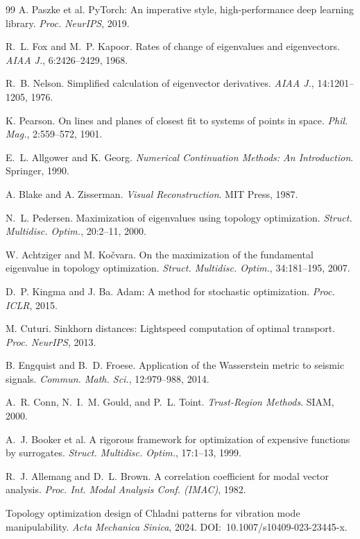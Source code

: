 \documentclass[11pt,a4paper]{article}
\begin{document}
\begin{thebibliography}{99}
 A. Paszke et al. PyTorch: An imperative style, high-performance
deep learning library. \textit{Proc. NeurIPS}, 2019.

 R.~L. Fox and M.~P. Kapoor. Rates of change of eigenvalues and
eigenvectors. \textit{AIAA J.}, 6:2426--2429, 1968.

 R.~B. Nelson. Simplified calculation of eigenvector
derivatives. \textit{AIAA J.}, 14:1201--1205, 1976.

 K. Pearson. On lines and planes of closest fit to systems of
points in space. \textit{Phil. Mag.}, 2:559--572, 1901.

 E.~L. Allgower and K. Georg. \textit{Numerical Continuation
Methods: An Introduction}. Springer, 1990.

 A. Blake and A. Zisserman. \textit{Visual Reconstruction}.
MIT Press, 1987.

 N.~L. Pedersen. Maximization of eigenvalues using topology
optimization. \textit{Struct. Multidisc. Optim.}, 20:2--11, 2000.

 W. Achtziger and M. Ko\v{c}vara. On the maximization of
the fundamental eigenvalue in topology optimization. \textit{Struct. Multidisc.
Optim.}, 34:181--195, 2007.

 D.~P. Kingma and J. Ba. Adam: A method for stochastic
optimization. \textit{Proc. ICLR}, 2015.

 M. Cuturi. Sinkhorn distances: Lightspeed computation of
optimal transport. \textit{Proc. NeurIPS}, 2013.

 B. Engquist and B.~D. Froese. Application of the
Wasserstein metric to seismic signals. \textit{Commun. Math. Sci.}, 12:979--988,
2014.

 A.~R. Conn, N.~I.~M. Gould, and P.~L. Toint.
\textit{Trust-Region Methods}. SIAM, 2000.

 A.~J. Booker et al. A rigorous framework for optimization of
expensive functions by surrogates. \textit{Struct. Multidisc. Optim.}, 17:1--13,
1999.

 R.~J. Allemang and D.~L. Brown. A correlation coefficient
for modal vector analysis. \textit{Proc. Int. Modal Analysis Conf. (IMAC)}, 1982.

 Topology optimization design of Chladni patterns for vibration
mode manipulability. \textit{Acta Mechanica Sinica}, 2024.
DOI:~10.1007/s10409-023-23445-x.


\end{thebibliography}
\end{document}
